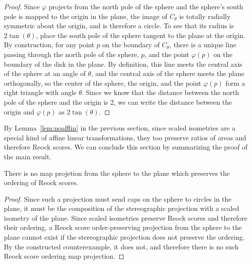 {\begin{proof}
Since $\varphi$ projects from the north pole of the sphere and the sphere's south pole is mapped to the origin in the plane, the image of $C_\theta$ is totally radially symmetric about the origin, and is therefore a circle.  To see that its radius is $2\tan(\theta)$, place the south pole of the sphere tangent to the plane at the origin. By construction, for any point $p$ on the boundary of $C_\theta$, there is a unique line passing through the north pole of the sphere, $p$, and the point $\varphi(p)$ on the boundary of the disk in the plane.  By definition, this line meets the central axis of the sphere at an angle of $\theta$, and the central axis of the sphere meets the plane orthogonally, so the center of the sphere, the origin, and the point $\varphi(p)$ form a right triangle with angle $\theta$.  Since we know that the distance between the north pole of the sphere and the origin is 2, we can write the distance between the origin and $\varphi(p)$ as $2\tan(\theta)$.

\end{proof}
}





 By Lemma~\ref{lem:noafflin} in the previous section, since scaled isometries are a special kind of affine linear transformations, they too preserve ratios of areas and therefore Reock scores.  We can conclude this section by summarizing the proof of the main result.

\begin{theorem}
There is no map projetion from the sphere to the plane which preserves the ordering of Reock scores.
\end{theorem}
\begin{proof}
Since such a projection must send caps on the sphere to circles in the plane, it must be the composition of the stereographic projection with a scaled isometry of the plane.  Since scaled isometries preserve Reock scores and therefore their ordering, a Reock score order-preserving projection from the sphere to the plane cannot exist if the stereographic projection does not preserve the ordering.  By the constructed counterexample, it does not, and therefore there is no such Reock score ordering map projection.
\end{proof}
